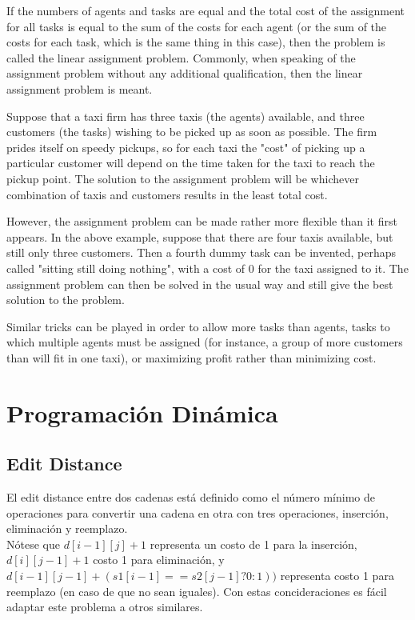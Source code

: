 \documentclass[10pt,letterpaper,twocolumn,twosided]{article}
\newcommand{\codigofuente}[1]{

\dotfill
}
\begin{document}
If the numbers of agents and tasks are equal and the total cost of the assignment for all tasks is equal to the sum of the costs for each agent (or the sum of the costs for each task, which is the same thing in this case), then the problem is called the linear assignment problem. Commonly, when speaking of the assignment problem without any additional qualification, then the linear assignment problem is meant.

Suppose that a taxi firm has three taxis (the agents) available, and three customers (the tasks) wishing to be picked up as soon as possible. The firm prides itself on speedy pickups, so for each taxi the "cost" of picking up a particular customer will depend on the time taken for the taxi to reach the pickup point. The solution to the assignment problem will be whichever combination of taxis and customers results in the least total cost.

However, the assignment problem can be made rather more flexible than it first appears. In the above example, suppose that there are four taxis available, but still only three customers. Then a fourth dummy task can be invented, perhaps called "sitting still doing nothing", with a cost of 0 for the taxi assigned to it. The assignment problem can then be solved in the usual way and still give the best solution to the problem.

Similar tricks can be played in order to allow more tasks than agents, tasks to which multiple agents must be assigned (for instance, a group of more customers than will fit in one taxi), or maximizing profit rather than minimizing cost.

\codigofuente{src/graphs/assigment.cpp}

\section{Programación Dinámica}

\subsection{Edit Distance}

El edit distance entre dos cadenas está definido como el número mínimo de operaciones para convertir una cadena en otra
con tres operaciones, inserción, eliminación y reemplazo.\\
Nótese que $d[i - 1][j] + 1$ representa un costo de 1 para la inserción, $d[i][j - 1] + 1$ costo 1 para eliminación, y $d[i - 1][j - 1] + (s1[i - 1] == s2[j - 1] ? 0 : 1))$ representa costo 1 para reemplazo (en caso de que no sean iguales). Con estas concideraciones es fácil adaptar este problema a otros similares.
\end{document}
